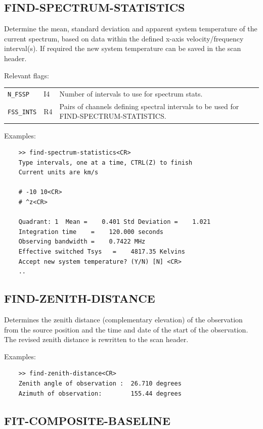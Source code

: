 \documentclass[11pt,twoside]{report}
\begin{document}
\subsection{FIND-SPECTRUM-STATISTICS} 

Determine the mean, standard deviation and apparent system temperature of
the current spectrum, based on data within the defined x-axis
velocity/frequency interval(s). If required the new system temperature can
be saved in the scan header.

Relevant flags:\\
\begin{tabular}{lll}
  \verb+N_FSSP+    & I4 & Number of intervals to use for spectrum stats.\\
  \verb+FSS_INTS+  & R4 & \parbox[t]{4in}
                          {Pairs of channels defining spectral intervals to
                           be used for FIND-SPECTRUM-STATISTICS.}
\end{tabular}

Examples:
\begin{verbatim}
    >> find-spectrum-statistics<CR>
    Type intervals, one at a time, CTRL(Z) to finish
    Current units are km/s

    # -10 10<CR>
    # ^z<CR>

    Quadrant: 1  Mean =    0.401 Std Deviation =    1.021
    Integration time    =    120.000 seconds
    Observing bandwidth =    0.7422 MHz
    Effective switched Tsys   =    4817.35 Kelvins
    Accept new system temperature? (Y/N) [N] <CR>
    ..
\end{verbatim}

\subsection{FIND-ZENITH-DISTANCE} 

Determines the zenith distance (complementary elevation) of the observation
from the source position and the time and date of the start of the
observation. The revised zenith distance is rewritten to the scan header.

Examples:
\begin{verbatim}
    >> find-zenith-distance<CR>
    Zenith angle of observation :  26.710 degrees
    Azimuth of observation:        155.44 degrees
\end{verbatim}

\subsection{FIT-COMPOSITE-BASELINE} 
\end{document}
